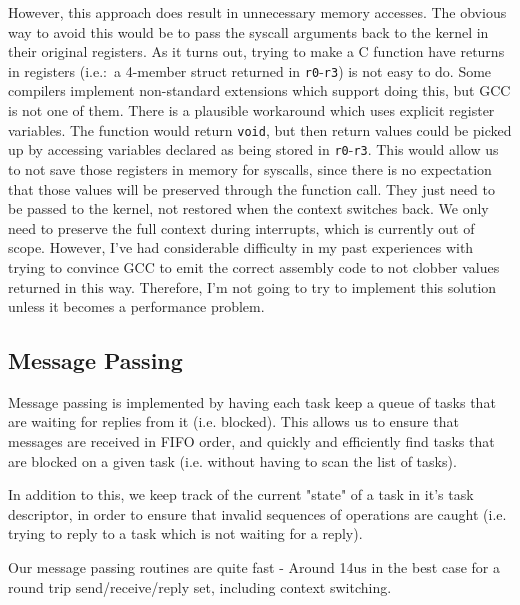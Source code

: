 \documentclass[titlepage]{article}
\begin{document}
However, this approach does result in unnecessary memory accesses.
The obvious way to avoid this would be to pass the syscall arguments back to the kernel
in their original registers.
As it turns out, trying to make a C function have returns in registers (i.e.:\ a 4-member
struct returned in \texttt{r0}-\texttt{r3}) is not easy to do.
Some compilers implement non-standard extensions which support doing this, but GCC
is not one of them.
There is a plausible workaround which uses explicit register variables.
The function would return \texttt{void}, but then return values could be picked up
by accessing variables declared as being stored in \texttt{r0}-\texttt{r3}.
This would allow us to not save those registers in memory for syscalls, since
there is no expectation that those values will be preserved through the function call.
They just need to be passed to the kernel, not restored when the context switches back.
We only need to preserve the full context during interrupts, which is
currently out of scope.
However, I've had considerable difficulty in my past experiences with trying to
convince GCC to emit the correct assembly code to not clobber values returned in this
way.
Therefore, I'm not going to try to implement this solution unless it becomes a
performance problem.

\subsection{Message Passing}
Message passing is implemented by having each task keep a queue
of tasks that are waiting for replies from it (i.e. blocked). This allows us
to ensure that messages are received in FIFO order, and quickly and efficiently
find tasks that are blocked on a given task (i.e. without having to scan the
list of tasks).

In addition to this, we keep track of the current "state" of a task in it's
task descriptor, in order to ensure that invalid sequences of operations are
caught (i.e. trying to reply to a task which is not waiting for a reply).

Our message passing routines are quite fast - Around 14us in the best case for
a round trip send/receive/reply set, including context switching.
\end{document}

